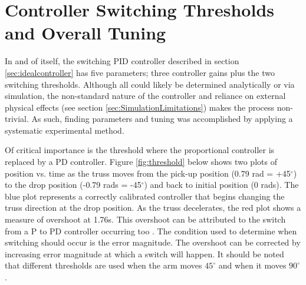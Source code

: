 \section{Controller Switching Thresholds and Overall Tuning}
\label{sec:thresholds}

In and of itself, the switching PID controller described in section \ref{sec:idealcontroller} has five parameters; three controller gains plus the two switching thresholds.
Although all could likely be determined analytically or via simulation, the non-standard nature of the controller and reliance on external physical effects (see section \ref{sec:SimulationLimitations}) makes the process non-trivial.
As such, finding parameters and tuning was accomplished by applying a systematic experimental method.

Of critical importance is the threshold where the proportional controller is replaced by a PD controller.
Figure \ref{fig:threshold} below shows two plots of position vs. time as the truss moves from the pick-up position (0.79 rad = +45$^\circ$) to the drop position (-0.79 rads = -45$^\circ$) and back to initial position (0 rads). 
The blue plot represents a correctly calibrated controller that begins changing the truss direction at the drop position. 
As the truss decelerates, the red plot shows a measure of overshoot at 1.76s. 
This overshoot can be attributed to the switch from a P to PD controller occurring too .
The condition used to determine when switching should occur is the error magnitude.
The overshoot can be corrected by increasing error magnitude at which a switch will happen.
It should be noted that different thresholds are used when the arm moves $45^\circ$ and when it moves $90^\circ$.



